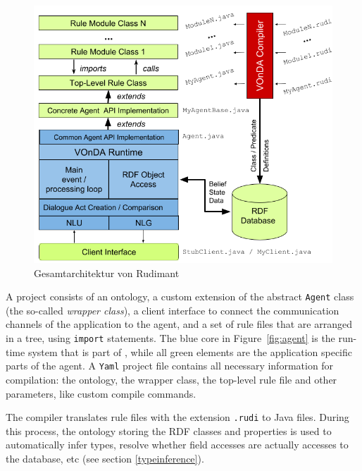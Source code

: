 \begin{figure}[htbp]
  \centering
  \includegraphics[width=.8\textwidth]{VOnDAStructureRot2.png}
  \caption{Gesamtarchitektur von Rudimant}
  \label{fig:architecture}
\end{figure}


A \vonda project consists of an ontology, a custom extension of the abstract
\texttt{Agent} class (the so-called \emph{wrapper class}), a client interface
to connect the communication channels of the application to the agent, and a
set of rule files that are arranged in a tree, using \texttt{import}
statements. The blue core in Figure~\ref{fig:agent} is the run-time system that
is part of \vonda, while all green elements are the application specific parts
of the agent. A \texttt{Yaml} project file contains all necessary information
for compilation: the ontology, the wrapper class, the top-level rule file and
other parameters, like custom compile commands.

The \vonda compiler translates rule files with the extension \texttt{.rudi} to Java files. During this process, the ontology storing the RDF classes and properties is used to automatically infer types, resolve whether field accesses are actually accesses to the database, etc (see section \ref{typeinference}).

